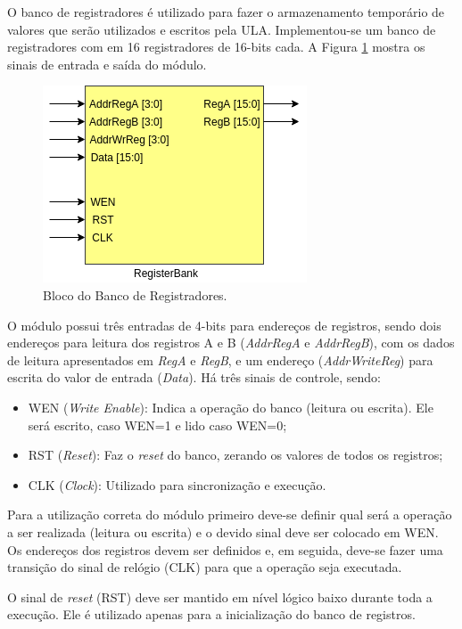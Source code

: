 \documentclass[11pt,a4paper,titlepage]{article}
\begin{document}
O banco de registradores é utilizado para fazer o armazenamento temporário de valores que serão utilizados e escritos pela ULA. Implementou-se um banco de registradores com em 16 registradores de 16-bits cada. A Figura \ref{fig:blocoregbank} mostra os sinais de entrada e saída do módulo.

\begin{figure}[h]
\centering
\includegraphics[scale=0.5]{images/RegisterBank.png}
\caption{Bloco do Banco de Registradores.}
\label{fig:blocoregbank}
\end{figure}

O módulo possui três entradas de 4-bits para endereços de registros, sendo dois endereços para leitura dos registros A e B (\textit{AddrRegA} e \textit{AddrRegB}), com os dados de leitura apresentados em \textit{RegA} e \textit{RegB}, e um endereço (\textit{AddrWriteReg}) para escrita do valor de entrada (\textit{Data}). Há três sinais de controle, sendo:

\begin{itemize}
\item WEN (\textit{Write Enable}): Indica a operação do banco (leitura ou escrita). Ele será escrito, caso WEN=1 e lido caso WEN=0;
\item RST (\textit{Reset}): Faz o \textit{reset} do banco, zerando os valores de todos os registros;
\item CLK (\textit{Clock}): Utilizado para sincronização e execução.
\end{itemize}

Para a utilização correta do módulo primeiro deve-se definir qual será a operação a ser realizada (leitura ou escrita) e o devido sinal deve ser colocado em WEN. Os endereços dos registros devem ser definidos e, em seguida, deve-se fazer uma transição do sinal de relógio (CLK) para que a operação seja executada.

O sinal de \textit{reset} (RST) deve ser mantido em nível lógico baixo durante toda a execução. Ele é utilizado apenas para a inicialização do banco de registros.
\end{document}
